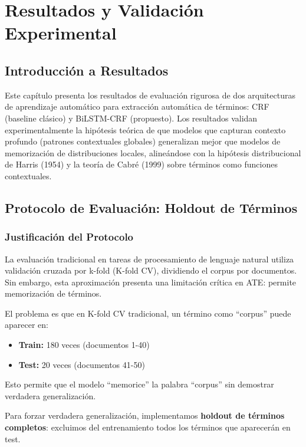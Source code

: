 \chapter{Resultados y Validación Experimental}

\section{Introducción a Resultados}

Este capítulo presenta los resultados de evaluación rigurosa de dos arquitecturas de aprendizaje automático para extracción automática de términos: CRF (baseline clásico) y BiLSTM-CRF (propuesto). Los resultados validan experimentalmente la hipótesis teórica de que modelos que capturan contexto profundo (patrones contextuales globales) generalizan mejor que modelos de memorización de distribuciones locales, alineándose con la hipótesis distribucional de Harris (1954) y la teoría de Cabré (1999) sobre términos como funciones contextuales.

\section{Protocolo de Evaluación: Holdout de Términos}

\subsection{Justificación del Protocolo}

La evaluación tradicional en tareas de procesamiento de lenguaje natural utiliza validación cruzada por k-fold (K-fold CV), dividiendo el corpus por documentos. Sin embargo, esta aproximación presenta una limitación crítica en ATE: permite memorización de términos.

El problema es que en K-fold CV tradicional, un término como ``corpus'' puede aparecer en:
\begin{itemize}
    \item \textbf{Train:} 180 veces (documentos 1-40)
    \item \textbf{Test:} 20 veces (documentos 41-50)
\end{itemize}

Esto permite que el modelo ``memorice'' la palabra ``corpus'' sin demostrar verdadera generalización.

Para forzar verdadera generalización, implementamos \textbf{holdout de términos completos}: excluimos del entrenamiento todos los términos que aparecerán en test.

